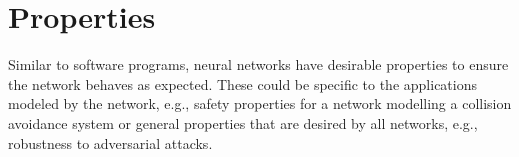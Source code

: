 \documentclass[oneside,11pt,dvipsnames]{book}
\numberwithin{equation}{section}
\theoremstyle{definition}
\theoremstyle{remark}
\begin{document}










\chapter{Properties}\label{chap:properties}

Similar to software programs, neural networks have desirable properties to ensure the network behaves as expected. These could be specific to the applications modeled by the network, e.g., safety properties for a network modelling a collision avoidance system or general properties that are desired by all networks, e.g., robustness to adversarial attacks. 
\end{document}
